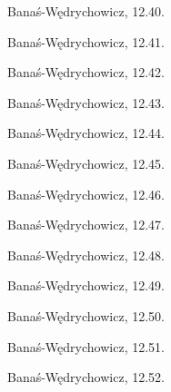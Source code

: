 \begin{problem}
    Banaś-Wędrychowicz, 12.40.
\end{problem}

\begin{problem}
    Banaś-Wędrychowicz, 12.41.
\end{problem}

\begin{problem}
    Banaś-Wędrychowicz, 12.42.
\end{problem}

\begin{problem}
    Banaś-Wędrychowicz, 12.43.
\end{problem}

\begin{problem}
    Banaś-Wędrychowicz, 12.44.
\end{problem}

\begin{problem}
    Banaś-Wędrychowicz, 12.45.
\end{problem}

\begin{problem}
    Banaś-Wędrychowicz, 12.46.
\end{problem}

\begin{problem}
    Banaś-Wędrychowicz, 12.47.
\end{problem}

\begin{problem}
    Banaś-Wędrychowicz, 12.48.
\end{problem}

\begin{problem}
    Banaś-Wędrychowicz, 12.49.
\end{problem}

\begin{problem}
    Banaś-Wędrychowicz, 12.50.
\end{problem}

\begin{problem}
    Banaś-Wędrychowicz, 12.51.
\end{problem}

\begin{problem}
    Banaś-Wędrychowicz, 12.52.
\end{problem}

